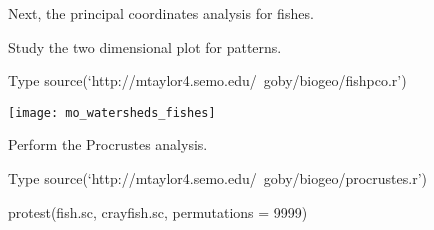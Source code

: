 \documentclass[t]{beamer}
\begin{document}
\begin{frame}[plain]{Next, the principal coordinates analysis for fishes.}

	\hangpara Study the two dimensional plot for patterns.

\begin{block}{Type}
	source(`http://mtaylor4.semo.edu/~goby/biogeo/fishpco.r')
\end{block}
\end{frame}


{
\begin{frame}[plain]
\end{frame}
}

\begin{frame}[plain]
	\centering
	\texttt{[image: mo\_watersheds\_fishes]}
\end{frame}


\begin{frame}[plain]{Perform the Procrustes analysis.}


\begin{block}{Type}
	source(`http://mtaylor4.semo.edu/~goby/biogeo/procrustes.r')
	\pause

	protest(fish.sc, crayfish.sc, permutations = 9999)
\end{block}
\end{frame}

{
\begin{frame}[plain]
\end{frame}
}
\end{document}
